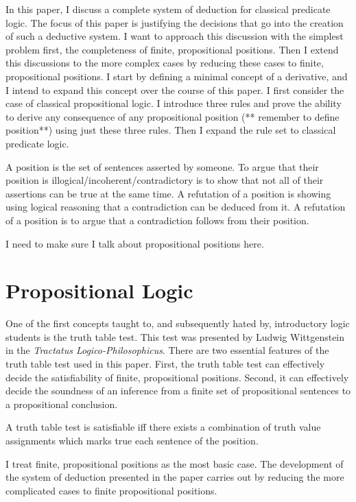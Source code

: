\documentclass[12pt]{article}
\theoremstyle{definition}
\theoremstyle{remark}
\begin{document}
In this paper, I discuss a complete system of deduction for classical predicate logic. The focus of this paper is justifying the decisions that go into the creation of such a deductive system. I want to approach this discussion with the simplest problem first, the completeness of finite, propositional positions. Then I extend this discussions to the more complex cases by reducing these cases to finite, propositional positions. I start by defining a minimal concept of a derivative, and I intend to expand this concept over the course of this paper. I first consider the case of classical propositional logic. I introduce three rules and prove the ability to derive any consequence of any propositional position (** remember to define position**) using just these three rules. Then I expand the rule set to classical predicate logic. 


A position is the set of sentences asserted by someone. To argue that their position is illogical/incoherent/contradictory is to show that not all of their assertions can be true at the same time. A refutation of a position is showing using logical reasoning that a contradiction can be deduced from it. A refutation of a position is to argue that a contradiction follows from their position.

I need to make sure I talk about propositional positions here.

\section{Propositional Logic}

One of the first concepts taught to, and subsequently hated by, introductory logic students is the truth table test. This test was presented by Ludwig Wittgenstein in the \textit{Tractatus Logico-Philosophicus}\cite{tractatus}. There are two essential features of the truth table test used in this paper. First, the truth table test can effectively decide the satisfiability of finite, propositional positions. Second, it can effectively decide the soundness of an inference from a finite set of propositional sentences to a propositional conclusion.

A truth table test is satisfiable iff there exists a combination of truth value assignments which marks true each sentence of the position.

I treat finite, propositional positions as the most basic case. The development of the system of deduction presented in the paper carries out by reducing the more complicated cases to finite propositional positions. 
\end{document}
